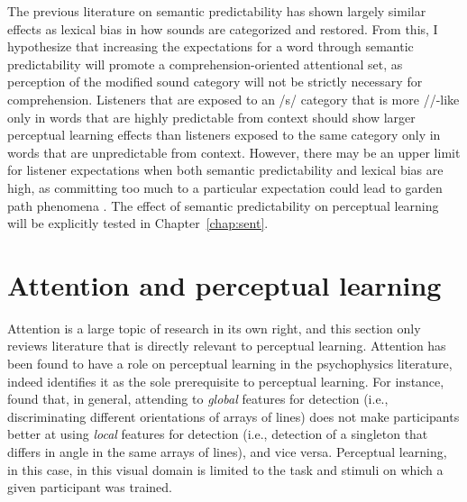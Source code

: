 The previous literature on semantic predictability has shown largely similar effects as lexical bias in how sounds are categorized and restored.  
From this, I hypothesize that increasing the expectations for a word through semantic predictability will promote a comprehension-oriented attentional set, as perception of the modified sound category will not be strictly necessary for comprehension.
Listeners that are exposed to an /s/ category that is more /\textesh/-like only in words that are highly predictable from context should show larger perceptual learning effects than listeners exposed to the same category only in words that are unpredictable from context.
However, there may be an upper limit for listener expectations when both semantic predictability and lexical bias are high, as committing too much to a particular expectation could lead to garden path phenomena \citep{Levy2008}.
The effect of semantic predictability on perceptual learning will be explicitly tested in Chapter~\ref{chap:sent}.

\section{Attention and perceptual learning}
\label{sec:attention}

Attention is a large topic of research in its own right, and this section only reviews literature that is directly relevant to perceptual learning.
Attention has been found to have a role on perceptual learning in the psychophysics literature, indeed \citet{Gibson1953} identifies it as the sole prerequisite to perceptual learning.
For instance, \citet{Ahissar1993} found that, in general, attending to \emph{global} features for detection (i.e., discriminating different orientations of arrays of lines) does not make participants better at using \emph{local} features for detection (i.e., detection of a singleton that differs in angle in the same arrays of lines), and vice versa.  Perceptual learning, in this case, in this visual domain is limited to the task and stimuli on which a given participant was trained.  

